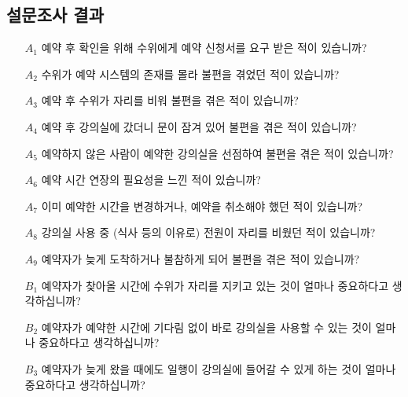 \documentclass[11pt,a4paper]{article}
\begin{document}
\subsection{설문조사 결과}
\begin{itemize}
\item[$A_1$] 예약 후 확인을 위해 수위에게 예약 신청서를 요구 받은 적이 있습니까?
\item[$A_2$] 수위가 예약 시스템의 존재를 몰라 불편을 겪었던 적이 있습니까?
\item[$A_3$] 예약 후 수위가 자리를 비워 불편을 겪은 적이 있습니까?
\item[$A_4$] 예약 후 강의실에 갔더니 문이 잠겨 있어 불편을 겪은 적이 있습니까?
\item[$A_5$] 예약하지 않은 사람이 예약한 강의실을 선점하여 불편을 겪은 적이 있습니까?
\item[$A_6$] 예약 시간 연장의 필요성을 느낀 적이 있습니까?
\item[$A_7$] 이미 예약한 시간을 변경하거나, 예약을 취소해야 했던 적이 있습니까?
\item[$A_8$] 강의실 사용 중 (식사 등의 이유로) 전원이 자리를 비웠던 적이 있습니까?
\item[$A_9$] 예약자가 늦게 도착하거나 불참하게 되어 불편을 겪은 적이 있습니까?
\item[$B_1$] 예약자가 찾아올 시간에 수위가 자리를 지키고 있는 것이 얼마나 중요하다고 생각하십니까?
\item[$B_2$] 예약자가 예약한 시간에 기다림 없이 바로 강의실을 사용할 수 있는 것이 얼마나 중요하다고 생각하십니까?
\item[$B_3$] 예약자가 늦게 왔을 때에도 일행이 강의실에 들어갈 수 있게 하는 것이 얼마나 중요하다고 생각하십니까?
\end{itemize}
\end{document}
